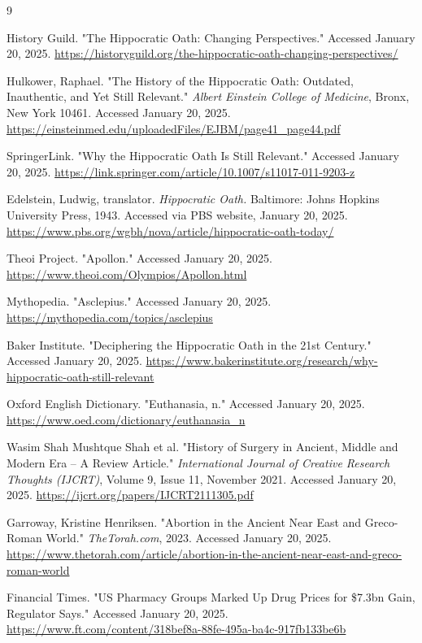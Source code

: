 \documentclass[12pt]{article}
\begin{document}
\newpage
\begin{thebibliography}{9}

History Guild. "The Hippocratic Oath: Changing Perspectives." Accessed January 20, 2025.  
\url{https://historyguild.org/the-hippocratic-oath-changing-perspectives/}

Hulkower, Raphael. "The History of the Hippocratic Oath: Outdated, Inauthentic, and Yet Still Relevant." \textit{Albert Einstein College of Medicine}, Bronx, New York 10461. Accessed January 20, 2025.  
\url{https://einsteinmed.edu/uploadedFiles/EJBM/page41_page44.pdf}

SpringerLink. "Why the Hippocratic Oath Is Still Relevant." Accessed January 20, 2025.  
\url{https://link.springer.com/article/10.1007/s11017-011-9203-z}

Edelstein, Ludwig, translator. \textit{Hippocratic Oath.} Baltimore: Johns Hopkins University Press, 1943. Accessed via PBS website, January 20, 2025.  
\url{https://www.pbs.org/wgbh/nova/article/hippocratic-oath-today/}

Theoi Project. "Apollon." Accessed January 20, 2025.  
\url{https://www.theoi.com/Olympios/Apollon.html}

Mythopedia. "Asclepius." Accessed January 20, 2025.  
\url{https://mythopedia.com/topics/asclepius}

Baker Institute. "Deciphering the Hippocratic Oath in the 21st Century." Accessed January 20, 2025.  
\url{https://www.bakerinstitute.org/research/why-hippocratic-oath-still-relevant}

Oxford English Dictionary. "Euthanasia, n." Accessed January 20, 2025.  
\url{https://www.oed.com/dictionary/euthanasia_n}

Wasim Shah Mushtque Shah et al. "History of Surgery in Ancient, Middle and Modern Era – A Review Article." \textit{International Journal of Creative Research Thoughts (IJCRT)}, Volume 9, Issue 11, November 2021. Accessed January 20, 2025.  
\url{https://ijcrt.org/papers/IJCRT2111305.pdf}

Garroway, Kristine Henriksen. "Abortion in the Ancient Near East and Greco-Roman World." \textit{TheTorah.com}, 2023. Accessed January 20, 2025.  
\url{https://www.thetorah.com/article/abortion-in-the-ancient-near-east-and-greco-roman-world}

Financial Times. "US Pharmacy Groups Marked Up Drug Prices for \$7.3bn Gain, Regulator Says." Accessed January 20, 2025.  
\url{https://www.ft.com/content/318bef8a-88fe-495a-ba4c-917fb133be6b}

\end{thebibliography}
\end{document}
